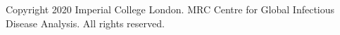 Copyright \textsuperscript{\textcopyright} 2020 Imperial College London. MRC Centre for Global Infectious Disease Analysis. All rights reserved.